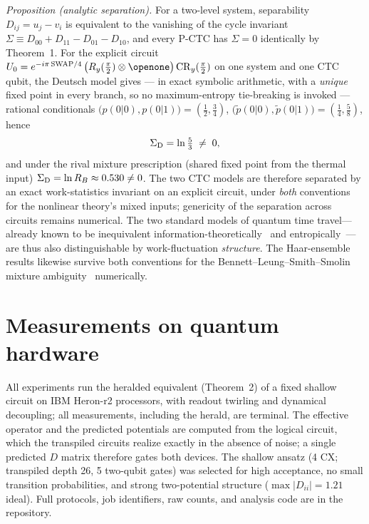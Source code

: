 \documentclass[aps,pra,twocolumn,superscriptaddress,nofootinbib]{revtex4-2}
\begin{document}
\emph{Proposition (analytic separation).} For a two-level system, separability $D_{ij}=u_j-v_i$ is equivalent to the vanishing of the cycle invariant $\Sigma\equiv D_{00}+D_{11}-D_{01}-D_{10}$, and every P-CTC has $\Sigma=0$ identically by Theorem~1. For the explicit circuit $U_0=e^{-i\pi\,\mathrm{SWAP}/4}\,\bigl(R_y(\tfrac{\pi}{2})\otimes\openone\bigr)\,\mathrm{CR}_y(\tfrac{\pi}{2})$ on one system and one CTC qubit, the Deutsch model gives --- in exact symbolic arithmetic, with a \emph{unique} fixed point in every branch, so no maximum-entropy tie-breaking is invoked --- rational conditionals $\bigl(p(0|0),p(0|1)\bigr)=(\tfrac12,\tfrac34)$, $\bigl(\tilde p(0|0),\tilde p(0|1)\bigr)=(\tfrac14,\tfrac58)$, hence
\begin{equation}
\Sigma_{\rm D}=\ln\tfrac{5}{3}\;\neq\;0 ,
\end{equation}
and under the rival mixture prescription (shared fixed point from the thermal input) $\Sigma_{\rm D}=\ln R_B\approx0.530\neq0$. The two CTC models are therefore separated by an exact work-statistics invariant on an explicit circuit, under \emph{both} conventions for the nonlinear theory's mixed inputs; genericity of the separation across circuits remains numerical. The two standard models of quantum time travel---already known to be inequivalent information-theoretically~\cite{brunwilde2012,blss2009} and entropically~\cite{bartkiewicz2019}---are thus also distinguishable by work-fluctuation \emph{structure}. The Haar-ensemble results likewise survive both conventions for the Bennett--Leung--Smith--Smolin mixture ambiguity~\cite{blss2009} numerically.

\section{Measurements on quantum hardware}
\label{sec:hardware}
All experiments run the heralded equivalent (Theorem~2) of a fixed shallow circuit on IBM Heron-r2 processors, with readout twirling and dynamical decoupling; all measurements, including the herald, are terminal. The effective operator and the predicted potentials are computed from the logical circuit, which the transpiled circuits realize exactly in the absence of noise; a single predicted $D$ matrix therefore gates both devices. The shallow ansatz (4 CX; transpiled depth 26, 5 two-qubit gates) was selected for high acceptance, no small transition probabilities, and strong two-potential structure ($\max|D_{ii}|=1.21$ ideal). Full protocols, job identifiers, raw counts, and analysis code are in the repository.
\end{document}
